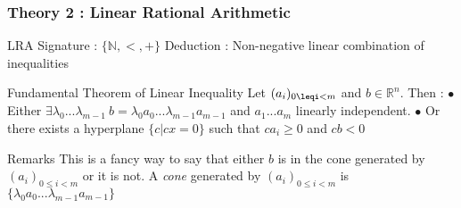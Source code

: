\documentclass[pdf]{beamer}
\newcommand{\N}{\ensuremath{\mathbb{N}}}
\newcommand{\R}{\ensuremath{\mathbb{R}}}
\begin{document}
\begin{frame}
\frametitle{Theory 2 : Linear Rational Arithmetic}

\begin{block}{LRA}
Signature : $\{\N,<,+\}$ \newline
Deduction : Non-negative linear combination of inequalities
\end{block}

\begin{alertblock}{Fundamental Theorem of Linear Inequality}
Let $(a_i)_{0\leqi<m}$ and $b \in \R^n$. Then : \newline
$\bullet$ Either $ \exists \lambda_0...\lambda_{m-1} ~b=\lambda_0 a_0...\lambda_{m-1} a_{m-1}$ and $a_1...a_m$ linearly independent. \newline
$\bullet$ Or there exists a hyperplane $\{c \vert cx=0\}$ such that $ca_i \geq0$ and $cb<0$
\end{alertblock}

\begin{exampleblock}{Remarks}
This is a fancy way to say that either $b$ is in the cone generated by $(a_i)_{0\leq i<m}$ or it is not.\newline
A \emph{cone} generated by $(a_i)_{0\leq i<m}$ is $\{\lambda_0 a_0...\lambda_{m-1} a_{m-1}\}$
\end{exampleblock}

\end{frame}
\end{document}

